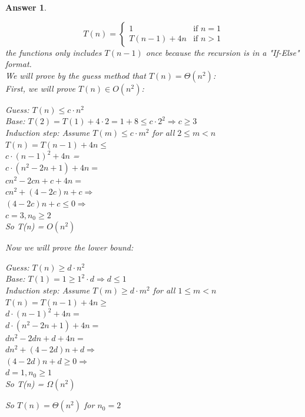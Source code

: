 \documentclass[a4paper]{article}
\theoremstyle{remarksStyle}
\theoremstyle{questionStyle}
\theoremstyle{answerStyle}
\newtheorem{answer}{Answer}
\begin{document}
\begin{answer}
\begin{center}
\end{center}
\[
    T(n) =
    \begin{cases}
        1              & \text{if } n = 1 \\
        T(n-1) + 4n    & \text{if } n > 1
    \end{cases}
\]
the functions only includes $T(n-1)$ once because the recursion is in a "If-Else" format.\\
\medskip
We will prove by the guess method that $T(n) = \Theta(n^2)$:\\
First, we will prove $T(n) \in O(n^2)$:\\
\medskip
\begin{center}
    Guess: $T(n) \leq c \cdot n^2$\\
    Base: $T(2) = T(1) + 4\cdot2 = 1 + 8 \leq c \cdot 2^2 \Rightarrow c \ge 3$\\
    Induction step: Assume $T(m) \leq c \cdot m^2$ for all $2\leq m< n$\\
    $T(n) = T(n-1)+4n\leq$ \\
    $c\cdot (n-1)^2 + 4n$ =\\
    $c \cdot (n^2 -2n + 1) + 4n =$\\
    $cn^2 - 2cn +c + 4n =$\\
    $cn^2 + (4-2c)n + c \Rightarrow$\\
    $(4-2c)n + c \leq 0 \Rightarrow$\\
    $c=3, n_0 \ge 2$ \checkmark \\
    So T(n) = $O(n^2)$
\end{center}
\medskip
Now we will prove the lower bound:\\
\begin{center}
     Guess: $T(n) \ge d \cdot n^2$\\
    Base: $T(1) =1 \ge 1^2 \cdot d \Rightarrow d \leq 1$\\
    Induction step: Assume $T(m) \ge d \cdot m^2$ for all $1\leq m< n$\\
    $T(n) = T(n-1)+4n \ge$\\
    $d \cdot (n-1)^2+4n =$\\
    $d \cdot (n^2 - 2n +1) + 4n =$\\
    $dn^2 -2dn + d   + 4n=$\\
    $dn^2 + (4 -2d)n + d \Rightarrow$\\
    $(4-2d)n +d \ge 0 \Rightarrow$\\
    $d =1, n_0 \ge 1 $ \checkmark\\
    So T(n) = $\Omega(n^2)$
\end{center}
\medskip 
So $T(n) = \Theta(n^2)$ for $n_0 =2$
\end{answer}
\end{document}
